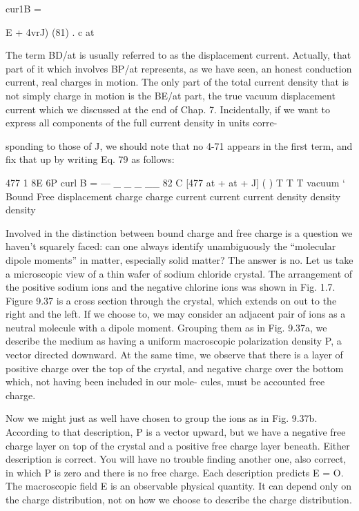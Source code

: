 cur1B = {E + 4vrJ) (81)
. c at

The term BD/at is usually referred to as the displacement current.
Actually, that part of it which involves BP/at represents, as we have
seen, an honest conduction current, real charges in motion. The
only part of the total current density that is not simply charge in
motion is the BE/at part, the true vacuum displacement current
which we discussed at the end of Chap. 7. Incidentally, if we want
to express all components of the full current density in units corre-

sponding to those of J, we should note that no 4-71 appears in the first
term, and fix that up by writing Eq. 79 as follows:

\begin{equation}
\end{equation}
477 1 8E 6P
curl B =  --- _ _ _ __ 82
C [477 at + at + J] ( )
T T T
vacuum ‘ Bound Free
displacement charge charge
current current current
density density density

Involved in the distinction between bound charge and free charge
is a question we haven't squarely faced: can one always identify
unambiguously the ``molecular dipole moments'' in matter, especially
solid matter? The answer is no. Let us take a microscopic view of
a thin wafer of sodium chloride crystal. The arrangement of the
positive sodium ions and the negative chlorine ions was shown in
Fig. 1.7. Figure 9.37 is a cross section through the crystal, which
extends on out to the right and the left. If we choose to, we may
consider an adjacent pair of ions as a neutral molecule with a dipole
moment. Grouping them as in Fig. 9.37a, we describe the medium
as having a uniform macroscopic polarization density P, a vector
directed downward. At the same time, we observe that there is a
layer of positive charge over the top of the crystal, and negative
charge over the bottom which, not having been included in our mole-
cules, must be accounted free charge.

Now we might just as well have chosen to group the ions as in
Fig. 9.37b. According to that description, P is a vector upward, but
we have a negative free charge layer on top of the crystal and a positive
free charge layer beneath. Either description is correct. You will
have no trouble finding another one, also correct, in which P is zero
and there is no free charge. Each description predicts E = O. The
macroscopic field E is an observable physical quantity. It can depend
only on the charge distribution, not on how we choose to describe
the charge distribution.

}
